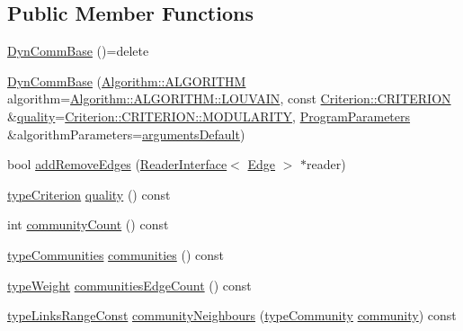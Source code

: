 \subsection*{Public Member Functions}
\begin{DoxyCompactItemize}
\item 
\hyperlink{classDynCommBase_a69682c03778e2f5d6b52c8139b26f454}{Dyn\+Comm\+Base} ()=delete
\item 
\hyperlink{classDynCommBase_a3dd8b3480d39f8be793d64a312b4da87}{Dyn\+Comm\+Base} (\hyperlink{classAlgorithm_a38e19a8c3dc51b97563a34d9e59a748d}{Algorithm\+::\+A\+L\+G\+O\+R\+I\+T\+HM} algorithm=\hyperlink{classAlgorithm_a38e19a8c3dc51b97563a34d9e59a748dab77e66715d6be972cdbf6cc4d990e732}{Algorithm\+::\+A\+L\+G\+O\+R\+I\+T\+H\+M\+::\+L\+O\+U\+V\+A\+IN}, const \hyperlink{classCriterion_a55594c223ce0837b8319c46c66cb648f}{Criterion\+::\+C\+R\+I\+T\+E\+R\+I\+ON} \&\hyperlink{classDynCommBase_a316b2c63a025810211d205ef6bf1d06c}{quality}=\hyperlink{classCriterion_a55594c223ce0837b8319c46c66cb648fa2a7d416fbe43baf234420601ea73d946}{Criterion\+::\+C\+R\+I\+T\+E\+R\+I\+O\+N\+::\+M\+O\+D\+U\+L\+A\+R\+I\+TY}, \hyperlink{structProgramParameters}{Program\+Parameters} \&algorithm\+Parameters=\hyperlink{program_8h_ae2d819404495f80f31db7676c1329d19}{arguments\+Default})
\item 
bool \hyperlink{classDynCommBase_a85ff9898ef25b12f3e80842c7b2696fe}{add\+Remove\+Edges} (\hyperlink{classReaderInterface}{Reader\+Interface}$<$ \hyperlink{classEdge}{Edge} $>$ $\ast$reader)
\item 
\hyperlink{criterionInterface_8h_af71ff22f6355fd69a4a62104bfd59a83}{type\+Criterion} \hyperlink{classDynCommBase_a316b2c63a025810211d205ef6bf1d06c}{quality} () const
\item 
int \hyperlink{classDynCommBase_add5d1d59a3f20b4ba039342b31551fb3}{community\+Count} () const
\item 
\hyperlink{graphUndirectedGroupable_8h_ab79c7252155ca17cb49aa0b1fea30116}{type\+Communities} \hyperlink{classDynCommBase_a064d9909a91cfe25acf05e6bd1fc967d}{communities} () const
\item 
\hyperlink{edge_8h_a2e7ea3be891ac8b52f749ec73fee6dd2}{type\+Weight} \hyperlink{classDynCommBase_af95d4ab7f1814514fd5961900731ba12}{communities\+Edge\+Count} () const
\item 
\hyperlink{graphInterface_8h_ae8d27008f15586bbf419af7ad2e0a48a}{type\+Links\+Range\+Const} \hyperlink{classDynCommBase_aba6f1f0fdd67a1d7f546d63706a60cde}{community\+Neighbours} (\hyperlink{graphUndirectedGroupable_8h_a914da95c9ea7f14f4b7f875c36818556}{type\+Community} \hyperlink{classDynCommBase_a651753518a2de4ea52caea518e74d878}{community}) const

\end{DoxyCompactItemize}
